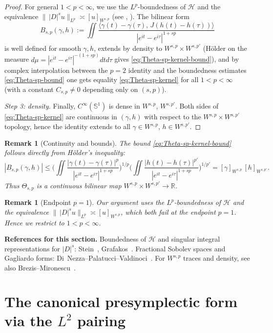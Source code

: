 \documentclass{amsart}
\newcounter{thm}
\newcounter{ex}
\newcounter{re}
\newtheorem{remark}[thm]{Remark}
\begin{document}
\begin{proof}
For general $1<p<\infty$, we use the $L^p$-boundedness of $\mathcal H$ and the equivalence
$\|\,|D|^s u\|_{L^p}\asymp [u]_{W^{s,p}}$ (see \cite[Th.\,6.5.1]{GrafakosCA},
\cite[Prop.\,3.4, 3.6]{DiNezzaPV}). The bilinear form
\[
B_{s,p}(\gamma,h)
:=\iint \frac{\langle \gamma(t)-\gamma(\tau),\,J(h(t)-h(\tau))\rangle}{|e^{it}-e^{i\tau}|^{1+sp}}
\]
is well defined for smooth $\gamma,h$, extends by density to
$W^{s,p}\times W^{s,p'}$ (H\"older on the measure $d\mu = |e^{it}-e^{i\tau}|^{-(1+sp)}dtd\tau$ gives
\eqref{eq:Theta-sp-kernel-bound}), and by complex interpolation between the
$p=2$ identity and the boundedness estimates \eqref{eq:Theta-sp-bound} one gets equality
\eqref{eq:Theta-sp-kernel} for all $1<p<\infty$ (with a constant $C_{s,p}\neq 0$ depending only on $(s,p)$).

\emph{Step 3: density.} Finally, $C^\infty(\mathbb S^1)$ is dense in $W^{s,p}$, $W^{s,p'}$.
Both sides of \eqref{eq:Theta-sp-kernel} are continuous in $(\gamma,h)$ with respect to the
$W^{s,p}\times W^{s,p'}$ topology, hence the identity extends to all
$\gamma\in W^{s,p}$, $h\in W^{s,p'}$.
\end{proof}

\begin{remark}[Continuity and bounds]
The bound \eqref{eq:Theta-sp-kernel-bound} follows directly from H\"older's inequality:
\[
|B_{s,p}(\gamma,h)|
\le \Big(\iint \frac{|\gamma(t)-\gamma(\tau)|^p}{|e^{it}-e^{i\tau}|^{1+sp}}\Big)^{\!1/p}
\Big(\iint \frac{|h(t)-h(\tau)|^{p'}}{|e^{it}-e^{i\tau}|^{1+sp}}\Big)^{\!1/p'}
=[\gamma]_{W^{s,p}}\,[h]_{W^{s,p'}}.
\]
Thus $\Theta_{s,p}$ is a continuous bilinear map $W^{s,p}\times W^{s,p'}\to\mathbb R$.
\end{remark}

\begin{remark}[Endpoint $p=1$]
Our argument uses the $L^p$-boundedness of $\mathcal H$ and the equivalence
$\|\,|D|^s u\|_{L^p}\asymp [u]_{W^{s,p}}$, which both fail at the endpoint $p=1$.
Hence we restrict to $1<p<\infty$.
\end{remark}

\medskip
\noindent\textbf{References for this section.}
Boundedness of $\mathcal H$ and singular integral representations for $|D|^s$:
Stein~\cite{SteinSI}, Grafakos~\cite{GrafakosCA}. Fractional Sobolev spaces and Gagliardo forms:
Di~Nezza--Palatucci--Valdinoci~\cite{DiNezzaPV}. For $W^{s,p}$ traces and density, see also
Brezis--Mironescu~\cite{BM1,BM2}.



\section{The canonical presymplectic form via the $L^2$ pairing}
\end{document}
